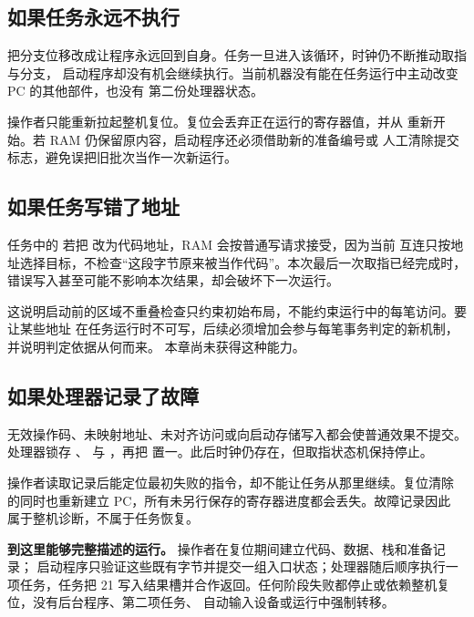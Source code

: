 \subsection{如果任务永远不执行 }

把分支位移改成让程序永远回到自身。任务一旦进入该循环，时钟仍不断推动取指与分支，
启动程序却没有机会继续执行。当前机器没有能在任务运行中主动改变 PC 的其他部件，也没有
第二份处理器状态。

操作者只能重新拉起整机复位。复位会丢弃正在运行的寄存器值，并从
 重新开始。若 RAM 仍保留原内容，启动程序还必须借助新的准备编号或
人工清除提交标志，避免误把旧批次当作一次新运行。

\subsection{如果任务写错了地址}

任务中的  若把  改为代码地址，RAM 会按普通写请求接受，因为当前
互连只按地址选择目标，不检查“这段字节原来被当作代码”。本次最后一次取指已经完成时，
错误写入甚至可能不影响本次结果，却会破坏下一次运行。

这说明启动前的区域不重叠检查只约束初始布局，不能约束运行中的每笔访问。要让某些地址
在任务运行时不可写，后续必须增加会参与每笔事务判定的新机制，并说明判定依据从何而来。
本章尚未获得这种能力。

\subsection{如果处理器记录了故障}

无效操作码、未映射地址、未对齐访问或向启动存储写入都会使普通效果不提交。处理器锁存
、 与 ，再把
 置一。此后时钟仍存在，但取指状态机保持停止。

操作者读取记录后能定位最初失败的指令，却不能让任务从那里继续。复位清除
 的同时也重新建立 PC，所有未另行保存的寄存器进度都会丢失。故障记录因此
属于整机诊断，不属于任务恢复。

\begin{problemframe}
\textbf{到这里能够完整描述的运行。} 操作者在复位期间建立代码、数据、栈和准备记录；
启动程序只验证这些既有字节并提交一组入口状态；处理器随后顺序执行一项任务，任务把 21
写入结果槽并合作返回。任何阶段失败都停止或依赖整机复位，没有后台程序、第二项任务、
自动输入设备或运行中强制转移。
\end{problemframe}
